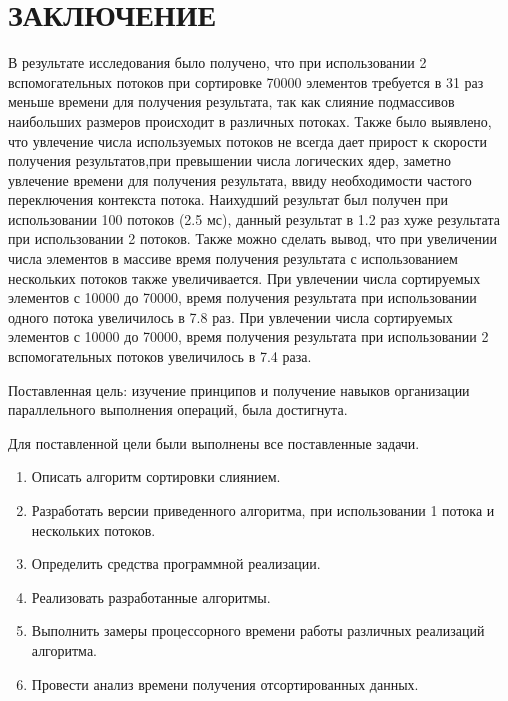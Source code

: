 \chapter*{\hfill{\centering  ЗАКЛЮЧЕНИЕ}\hfill}

В результате исследования было получено, что при использовании 2 вспомогательных потоков при сортировке 70000 элементов требуется в 31 раз меньше времени для получения результата, так как слияние подмассивов наибольших размеров происходит в различных потоках. Также было выявлено, что увлечение числа используемых потоков не всегда дает прирост к скорости получения результатов,при превышении числа логических ядер, заметно увлечение времени для получения результата, ввиду необходимости частого переключения контекста потока. Наихудший результат был получен при использовании 100 потоков (2.5 мс), данный результат в 1.2 раз хуже результата при использовании 2 потоков. Также можно сделать вывод, что при увеличении числа элементов в массиве
время получения результата с использованием нескольких потоков также увеличивается. При увлечении числа сортируемых элементов с 10000 до 70000, время получения результата при использовании одного потока  увеличилось в 7.8 раз.
При увлечении числа сортируемых элементов с 10000 до 70000, время получения результата при использовании 2 вспомогательных потоков увеличилось в 7.4 раза.


Поставленная цель: изучение принципов и получение навыков организации параллельного выполнения операций, была достигнута.

Для поставленной цели были выполнены все поставленные задачи.
\label{sec:targets}
\begin{enumerate}
	\item Описать алгоритм сортировки слиянием.
	\item Разработать версии  приведенного алгоритма, при использовании 1 потока и нескольких потоков.
	\item Определить средства программной реализации.
	\item Реализовать разработанные алгоритмы.
	\item Выполнить замеры процессорного времени работы различных реализаций алгоритма.
	\item Провести анализ времени получения отсортированных данных.
\end{enumerate}

 

